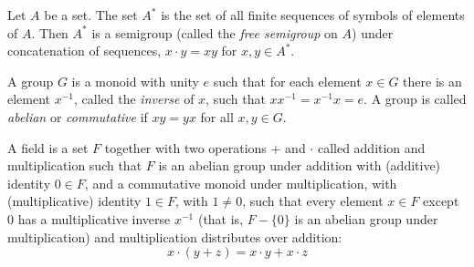  
 \begin{defn}
Let $A$ be a set. The set $A^*$ is the set of all finite sequences of symbols of elements of $A$. Then $A^*$ is a semigroup (called the \emph{free semigroup} on $A$) under concatenation of sequences, $x\cdot y = xy$ for $x,y \in A^*$.
 \end{defn}
 
 
 \begin{defn}[Group]
 A group $G$ is a monoid with unity $e$ such that for each element $x \in G$ there is an element $x^{-1}$, called the \emph{inverse} of $x$, such that $xx^{-1} = x^{-1}x = e$. A group is called \emph{abelian} or \emph{commutative} if $xy = yx$ for all $x,y\in G$.
 \end{defn}
 
 \begin{defn}[Field]
 A field is a set $F$ together with two operations $+$ and $\cdot$ called addition and multiplication such that $F$ is an abelian group under addition with (additive) identity $0 \in F$, and a commutative monoid under multiplication, with (multiplicative) identity $1 \in F$, with $1 \neq 0$, such that every element $x \in F$ except $0$ has a multiplicative inverse $x^{-1}$ (that is, $F - \{0\}$ is an abelian group under multiplication) and multiplication distributes over addition:
$$x\cdot(y + z) = x\cdot y + x \cdot z$$
\end{defn}

